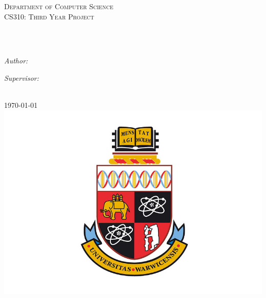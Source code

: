 \documentclass[
11pt,
english,
singlespacing,
headsepline,
]{MastersDoctoralThesis}
\author{Thomas \textsc{Allton}}
\begin{document}
\pagestyle{plain}


\begin{titlepage}
\begin{center}

\vspace*{.1\textheight}
{\scshape\LARGE \univname\par}\vspace{1.5cm}
\textsc{\Large Department of Computer Science}\\[0.5cm]
\textsc{\large CS310: Third Year Project}\\[0.5cm]

\HRule \\[0.4cm]
{\huge \bfseries \ttitle\par}\vspace{0.4cm}
\HRule \\[1.5cm]
 
\begin{minipage}[t]{0.4\textwidth}
\begin{flushleft} \large
\emph{Author:}\\
\href{https://www.tomallton.com}{\authorname}
\end{flushleft}
\end{minipage}
\begin{minipage}[t]{0.4\textwidth}
\begin{flushright} \large
\emph{Supervisor:} \\
\href{https://warwick.ac.uk/fac/sci/dcs/people/sara_kalvala/}{\supname}
\end{flushright}
\end{minipage}\\[2cm]
{\large \today}\\[2cm]
\includegraphics{Logo}
\end{center}
\end{titlepage}
\end{document}

